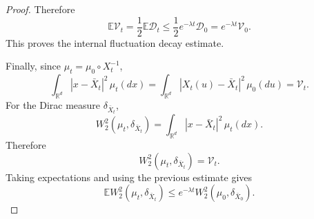\documentclass{tsp-short}
\theoremstyle{remark}
\theoremstyle{definition}
\newcommand{\R}{\mathbb{R}} %
\newcommand{\E}{\mathbb E} %
\begin{document}
\begin{proof}
	Therefore
	\begin{equation*}
		\E\mathcal V_t = \frac12\E\mathcal D_t \le \frac12 e^{-\lambda t}\mathcal D_0 = e^{-\lambda t}\mathcal V_0.
	\end{equation*}
	This proves the internal fluctuation decay estimate.

	Finally, since \(\mu_t =\mu_0\circ X_t^{-1}\),
	\begin{equation*}
		\int_{\R^d}|x-\bar X_t|^2\,\mu_t(dx) = \int_{\R^d}|X_t(u)-\bar X_t|^2\,\mu_0(du) = \mathcal V_t.
	\end{equation*}
	For the Dirac measure \(\delta_{\bar X_t}\),
	\begin{equation*}
		W_2^2(\mu_t,\delta_{\bar X_t}) = \int_{\R^d}|x-\bar X_t|^2\,\mu_t(dx).
	\end{equation*}
	Therefore
	\begin{equation*}
		W_2^2(\mu_t,\delta_{\bar X_t})=\mathcal V_t.
	\end{equation*}
	Taking expectations and using the previous estimate gives
	\begin{equation*}
		\E W_2^2(\mu_t,\delta_{\bar X_t}) \le e^{-\lambda t}W_2^2(\mu_0,\delta_{\bar X_0}).
	\end{equation*}
\end{proof}



\end{document}
